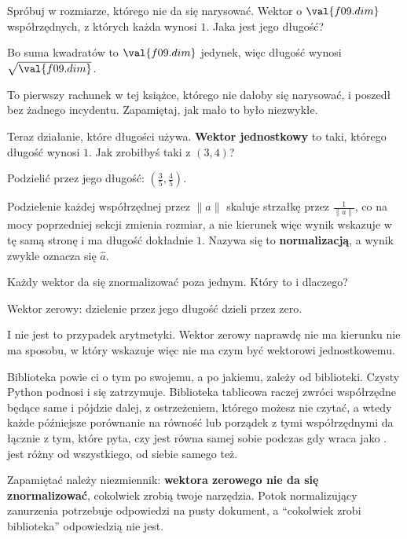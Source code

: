 \begin{fr}
Spróbuj w rozmiarze, którego nie da się narysować. Wektor o $\val{f09.dim}$
współrzędnych, z których każda wynosi $1$. Jaka jest jego długość?
\nextframe
\end{fr}

\begin{fr}
Bo suma kwadratów to $\val{f09.dim}$ jedynek, więc długość wynosi
$\sqrt{\val{f09.dim}}$.

To pierwszy rachunek w tej książce, którego nie dałoby się narysować, i poszedł
bez żadnego incydentu. Zapamiętaj, jak mało to było niezwykłe.

Teraz działanie, które długości używa. \textbf{Wektor jednostkowy} to taki,
którego długość wynosi $1$. Jak zrobiłbyś taki z $(3, 4)$?
\nextframe
\end{fr}

\begin{fr}
\begin{ansblock}
Podzielić przez jego długość: $\left(\frac{3}{5}, \frac{4}{5}\right)$.
\end{ansblock}

Podzielenie każdej współrzędnej przez $\lVert a \rVert$ skaluje strzałkę przez
$\frac{1}{\lVert a \rVert}$, co na mocy poprzedniej sekcji zmienia rozmiar, a
nie kierunek \dash{} więc wynik wskazuje w tę samą stronę i ma długość
dokładnie $1$. Nazywa się to \textbf{normalizacją}, a wynik zwykle oznacza się
$\hat{a}$.

Każdy wektor da się znormalizować poza jednym. Który to i dlaczego?
\nextframe
\end{fr}

\begin{fr}
\begin{ansblock}
Wektor zerowy: dzielenie przez jego długość dzieli przez zero.
\end{ansblock}

I nie jest to przypadek arytmetyki. Wektor zerowy naprawdę nie ma kierunku
\dash{} nie ma sposobu, w który wskazuje \dash{} więc nie ma czym być
wektorowi jednostkowemu.

\begin{warning}
Biblioteka powie ci o tym po swojemu, a po jakiemu, zależy od biblioteki. Czysty
Python podnosi  i się zatrzymuje. Biblioteka tablicowa
raczej zwróci współrzędne będące same  i pójdzie dalej, z
ostrzeżeniem, którego możesz nie czytać, a wtedy każde późniejsze porównanie
na równość lub porządek z tymi współrzędnymi da  \dash{} łącznie
z tym, które pyta, czy jest równa samej sobie \dash{} podczas gdy \code{!=}
wraca jako .  jest różny od wszystkiego, od siebie
samego też.

Zapamiętać należy niezmiennik: \textbf{wektora zerowego nie da się
znormalizować}, cokolwiek zrobią twoje narzędzia. Potok normalizujący zanurzenia
potrzebuje odpowiedzi na pusty dokument, a \enquote{cokolwiek zrobi biblioteka}
odpowiedzią nie jest.
\end{warning}
\end{fr}

